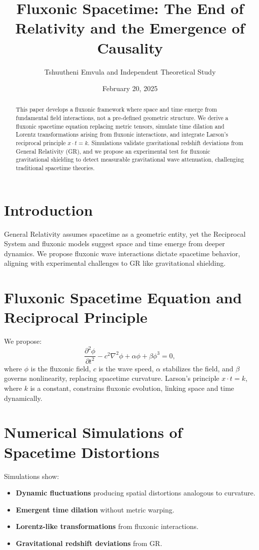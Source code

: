 \documentclass{article}
\title{Fluxonic Spacetime: The End of Relativity and the Emergence of Causality}
\author{Tshuutheni Emvula and Independent Theoretical Study}
\date{February 20, 2025}
\begin{document}
\maketitle

\begin{abstract}
This paper develops a fluxonic framework where space and time emerge from fundamental field interactions, not a pre-defined geometric structure. We derive a fluxonic spacetime equation replacing metric tensors, simulate time dilation and Lorentz transformations arising from fluxonic interactions, and integrate Larson’s reciprocal principle \(x \cdot t = k\). Simulations validate gravitational redshift deviations from General Relativity (GR), and we propose an experimental test for fluxonic gravitational shielding to detect measurable gravitational wave attenuation, challenging traditional spacetime theories.
\end{abstract}

\section{Introduction}
General Relativity assumes spacetime as a geometric entity, yet the Reciprocal System and fluxonic models suggest space and time emerge from deeper dynamics. We propose fluxonic wave interactions dictate spacetime behavior, aligning with experimental challenges to GR like gravitational shielding.

\section{Fluxonic Spacetime Equation and Reciprocal Principle}
We propose:
\begin{equation}
\frac{\partial^2 \phi}{\partial t^2} - c^2 \nabla^2 \phi + \alpha \phi + \beta \phi^3 = 0,
\end{equation}
where \(\phi\) is the fluxonic field, \(c\) is the wave speed, \(\alpha\) stabilizes the field, and \(\beta\) governs nonlinearity, replacing spacetime curvature. Larson’s principle \(x \cdot t = k\), where \(k\) is a constant, constrains fluxonic evolution, linking space and time dynamically.

\section{Numerical Simulations of Spacetime Distortions}
Simulations show:
\begin{itemize}
    \item \textbf{Dynamic fluctuations} producing spatial distortions analogous to curvature.
    \item \textbf{Emergent time dilation} without metric warping.
    \item \textbf{Lorentz-like transformations} from fluxonic interactions.
    \item \textbf{Gravitational redshift deviations} from GR.
\end{itemize}
\end{document}
